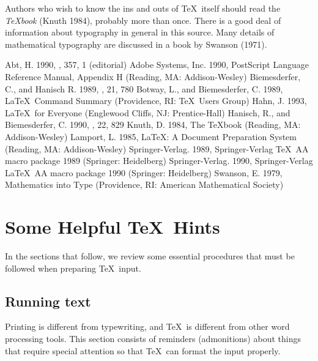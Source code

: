 Authors who wish to know the ins and outs of \TeX\ itself
should read the {\it\TeX book} (Knuth 1984), probably more than once.
There is a good deal of information about typography in general
in this source.  Many details of mathematical typography are
discussed in a book by Swanson (1971).

\begin{references}
 Abt, H.  1990, \apj, 357, 1 (editorial)
 Adobe Systems, Inc.  1990, PostScript Language Reference
    Manual, Appendix H (Reading, MA: Addison-Wesley)
 Biemesderfer, C., and Hanisch R.  1989, \baas, 21, 780
 Botway, L., and Biemesderfer, C.  1989,
    {\rm \LaTeX\ Command Summary} (Providence, RI: \TeX\ Users Group)
 Hahn, J. 1993, {\rm \LaTeX\ for Everyone} (Englewood Cliffs, NJ:
Prentice-Hall)
 Hanisch, R., and Biemesderfer, C.  1990, \baas, 22, 829
 Knuth, D.  1984, {\rm The \TeX book} (Reading, MA: Addison-Wesley)
 Lamport, L.  1985,
    {\rm \LaTeX: A Document Preparation System\/} (Reading, MA: Addison-Wesley)
 Springer-Verlag.  1989,
    {\rm Springer-Verlag \TeX\ AA macro package 1989}
    (Springer: Heidelberg)
 Springer-Verlag.  1990,
    {\rm Springer-Verlag \LaTeX\ AA macro package 1990}
    (Springer: Heidelberg)
 Swanson, E.  1979, {\rm Mathematics into Type} (Providence, RI:
    American Mathematical Society)
\end{references}

\newpage
\appendix
\section{Some Helpful \TeX\ Hints}

In the sections that follow, we review some essential procedures
that must be followed when preparing \TeX\ input.

\subsection{Running text}

Printing is different from typewriting, and \TeX\ is different
from other word processing tools.  This section consists of
reminders (admonitions) about things that require special
attention so that \TeX\ can format the input properly.

